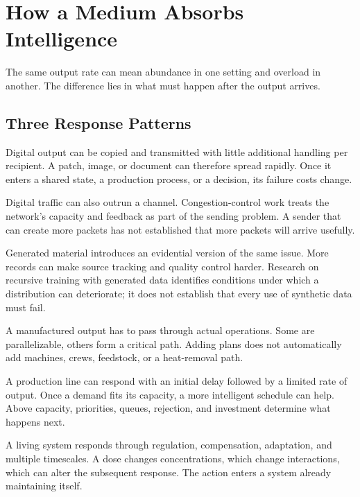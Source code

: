 \section{How a Medium Absorbs Intelligence}

The same output rate can mean abundance in one setting and overload in another. The difference lies in what must happen after the output arrives.

\subsection{Three Response Patterns}


Digital output can be copied and transmitted with little additional handling per recipient. A patch, image, or document can therefore spread rapidly. Once it enters a shared state, a production process, or a decision, its failure costs change.

Digital traffic can also outrun a channel. Congestion-control work treats the network's capacity and feedback as part of the sending problem.\cite{jacobson1988} A sender that can create more packets has not established that more packets will arrive usefully.

Generated material introduces an evidential version of the same issue. More records can make source tracking and quality control harder. Research on recursive training with generated data identifies conditions under which a distribution can deteriorate; it does not establish that every use of synthetic data must fail.\cite{shumailov2024ai}


A manufactured output has to pass through actual operations. Some are parallelizable, others form a critical path. Adding plans does not automatically add machines, crews, feedstock, or a heat-removal path.

A production line can respond with an initial delay followed by a limited rate of output. Once a demand fits its capacity, a more intelligent schedule can help. Above capacity, priorities, queues, rejection, and investment determine what happens next.


A living system responds through regulation, compensation, adaptation, and multiple timescales. A dose changes concentrations, which change interactions, which can alter the subsequent response. The action enters a system already maintaining itself.

